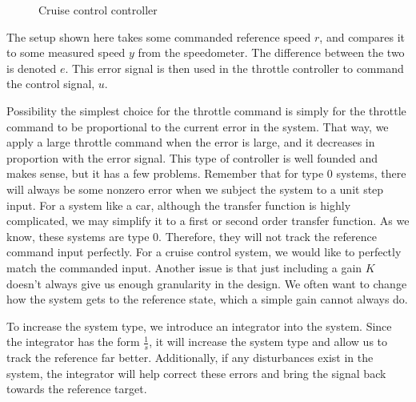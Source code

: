 \begin{figure}

    \caption{Cruise control controller}
    \label{fig:cruise cont}
\end{figure}

The setup shown here takes some commanded reference speed $r$, and compares it to some measured speed $y$ from the speedometer. The difference between the two is denoted $e$. This error signal is then used in the throttle controller to command the control signal, $u$.

Possibility the simplest choice for the throttle command is simply for the throttle command to be proportional to the current error in the system. That way, we apply a large throttle command when the error is large, and it decreases in proportion with the error signal. This type of controller is well founded and makes sense, but it has a few problems. Remember that for type 0 systems, there will always be some nonzero error when we subject the system to a unit step input. For a system like a car, although the transfer function is highly complicated, we may simplify it to a first or second order transfer function. As we know, these systems are type 0. Therefore, they will not track the reference command input perfectly. For a cruise control system, we would like to perfectly match the commanded input. Another issue is that just including a gain $K$ doesn't always give us enough granularity in the design. We often want to change how the system gets to the reference state, which a simple gain cannot always do.

To increase the system type, we introduce an integrator into the system. Since the integrator has the form $\frac{1}{s}$, it will increase the system type and allow us to track the reference far better. Additionally, if any disturbances exist in the system, the integrator will help correct these errors and bring the signal back towards the reference target.

